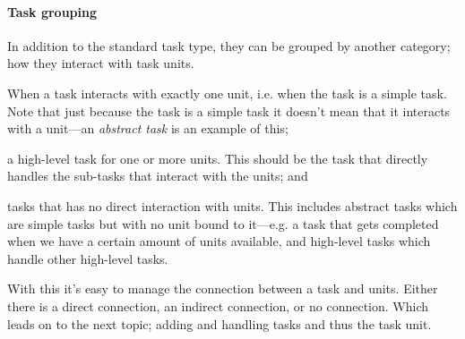 \paragraph{Task grouping}
In addition to the standard task type, they can be grouped by another category; how they interact
with task units.
\begin{inparaenum}
\item When a task interacts with exactly one unit, i.e. when the task is a simple task. Note that
just because the task is a simple task it doesn't mean that it interacts with a
unit---an \emph{abstract task} is an example of this;
\item a high-level task for one or more units. This should be the task that directly handles
the sub-tasks that interact with the units; and
\item tasks that has no direct interaction with units. This includes abstract tasks which are
simple tasks but with no unit bound to it---e.g. a task that gets completed when we have a certain
amount of units available, and high-level tasks which handle other high-level tasks. 
\end{inparaenum}

With this it's easy to manage the connection between a task and units. Either there is a
direct connection, an indirect connection, or no connection. Which leads on to the next topic;
adding and handling tasks and thus the task unit.

